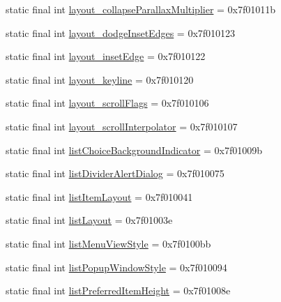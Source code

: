\begin{CompactItemize}
\item 
static final int \hyperlink{classandroid_1_1support_1_1v7_1_1appcompat_1_1_r_1_1attr_39c0da563750485f4bcf4eaee21416ed}{layout\_\-collapseParallaxMultiplier} = 0x7f01011b
\item 
static final int \hyperlink{classandroid_1_1support_1_1v7_1_1appcompat_1_1_r_1_1attr_aef55865ca112a3597895ebbd22a657d}{layout\_\-dodgeInsetEdges} = 0x7f010123
\item 
static final int \hyperlink{classandroid_1_1support_1_1v7_1_1appcompat_1_1_r_1_1attr_d2da71c9aa5be417759290945162974d}{layout\_\-insetEdge} = 0x7f010122
\item 
static final int \hyperlink{classandroid_1_1support_1_1v7_1_1appcompat_1_1_r_1_1attr_116afb9eb785e88b06909ddc35d84370}{layout\_\-keyline} = 0x7f010120
\item 
static final int \hyperlink{classandroid_1_1support_1_1v7_1_1appcompat_1_1_r_1_1attr_0b0bb37b2387eae73cd1d1f2ca74c9fe}{layout\_\-scrollFlags} = 0x7f010106
\item 
static final int \hyperlink{classandroid_1_1support_1_1v7_1_1appcompat_1_1_r_1_1attr_742dbff330d88516a9d1593210315a63}{layout\_\-scrollInterpolator} = 0x7f010107
\item 
static final int \hyperlink{classandroid_1_1support_1_1v7_1_1appcompat_1_1_r_1_1attr_5da1cfb828e8d56dd3ff215cf36a6dfa}{listChoiceBackgroundIndicator} = 0x7f01009b
\item 
static final int \hyperlink{classandroid_1_1support_1_1v7_1_1appcompat_1_1_r_1_1attr_2b834a5899346a685d244ec6edb120be}{listDividerAlertDialog} = 0x7f010075
\item 
static final int \hyperlink{classandroid_1_1support_1_1v7_1_1appcompat_1_1_r_1_1attr_9ceef92d5fde40b20ea8b8e018b6082f}{listItemLayout} = 0x7f010041
\item 
static final int \hyperlink{classandroid_1_1support_1_1v7_1_1appcompat_1_1_r_1_1attr_954dc0e19e88ad4929bd39f2f29ed469}{listLayout} = 0x7f01003e
\item 
static final int \hyperlink{classandroid_1_1support_1_1v7_1_1appcompat_1_1_r_1_1attr_87c592d14ff7a2d9c501d19a795c3004}{listMenuViewStyle} = 0x7f0100bb
\item 
static final int \hyperlink{classandroid_1_1support_1_1v7_1_1appcompat_1_1_r_1_1attr_b6828cebd0625e00b32de4a909de2ac2}{listPopupWindowStyle} = 0x7f010094
\item 
static final int \hyperlink{classandroid_1_1support_1_1v7_1_1appcompat_1_1_r_1_1attr_2dafa35fa3f44cce1a4ef98ce50d0f6f}{listPreferredItemHeight} = 0x7f01008e

\end{CompactItemize}
